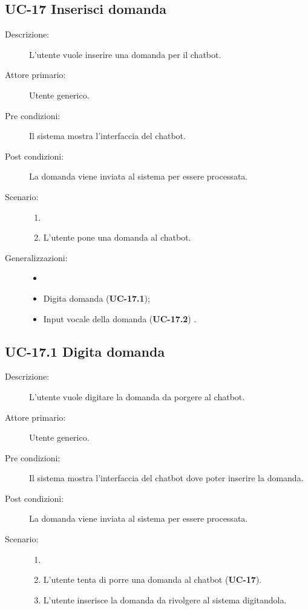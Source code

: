 \subsection{UC-17 Inserisci domanda}
\begin{description}
    \item[Descrizione:] L'utente vuole inserire una domanda per il chatbot.
    \item[Attore primario:] Utente generico.
    \item[Pre condizioni:] Il sistema mostra l'interfaccia del chatbot.
    \item[Post condizioni:] La domanda viene inviata al sistema per essere processata.
    \item[Scenario:]
    \begin{enumerate}
        \item[]
        \item L’utente pone una domanda al chatbot.
    \end{enumerate}
    \item[Generalizzazioni:] 
    \begin{itemize}
        \item[] 
        \item Digita domanda (\textbf{UC-17.1});
        \item Input vocale della domanda (\textbf{UC-17.2}) .
    \end{itemize}
\end{description}

\subsection{UC-17.1 Digita domanda}
\begin{description}
    \item[Descrizione:] L'utente vuole digitare la domanda da porgere al chatbot.
    \item[Attore primario:] Utente generico.
    \item[Pre condizioni:] Il sistema mostra l'interfaccia del chatbot dove poter inserire la domanda.
    \item[Post condizioni:] La domanda viene inviata al sistema per essere processata.
    \item[Scenario:]
    \begin{enumerate}
        \item[]
        \item L’utente tenta di porre una domanda al chatbot (\textbf{UC-17}).
        \item L'utente inserisce la domanda da rivolgere al sistema digitandola.
    \end{enumerate}
\end{description}

